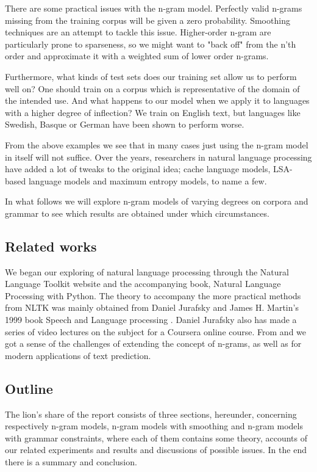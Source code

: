 \documentclass[a4paper,12pt]{article}
\begin{document}
There are some practical issues with the n-gram model. Perfectly valid n-grams missing from the training corpus will be given a zero probability. Smoothing techniques are an attempt to tackle this issue. Higher-order n-gram are particularly prone to sparseness, so we might want to "back off" from the n'th order and approximate it with a weighted sum of lower order n-grams. 

Furthermore, what kinds of test sets does our training set allow us to perform well on? One should train on a  corpus which is representative of the domain of the intended use. And what happens to our model when we apply it to languages with a higher degree of inflection? We train on English text, but languages like Swedish, Basque or German have been shown to perform worse.\cite{garay2006text}

From the above examples we see that in many cases just using the n-gram model in itself will not suffice. Over the years, researchers in natural language processing have added a lot of tweaks to the original idea; cache language models, LSA-based language models and maximum entropy models, to name a few.

In what follows we will explore n-gram models of varying degrees on corpora and grammar to see which results are obtained under which circumstances.

\subsection{Related works}
We began our exploring of natural language processing through the Natural Language Toolkit website and the accompanying book, Natural Language Processing with Python. The theory to accompany the more practical methods from NLTK was mainly obtained from Daniel Jurafsky and James H. Martin's 1999 book Speech and Language processing \cite{JurafskyBook}. Daniel Jurafsky also has made a series of video lectures on the subject for a Coursera online course. From \cite{brown1992class} and \cite{garay2006text} we got a sense of the challenges of extending the concept of n-grams, as well as for modern applications of text prediction.

\subsection{Outline}
The lion's share of the report consists of three sections, hereunder, concerning respectively n-gram models, n-gram models with smoothing and n-gram models with grammar constraints, where each of them contains some theory, accounts of our related experiments and results and discussions of possible issues. In the end there is a summary and conclusion.
\end{document}
